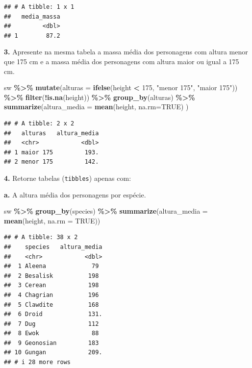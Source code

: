 \documentclass[
]{book}
\newenvironment{Shaded}{\begin{snugshade}}{\end{snugshade}}
\newcommand{\AttributeTok}[1]{\textcolor[rgb]{0.13,0.29,0.53}{#1}}
\newcommand{\ConstantTok}[1]{\textcolor[rgb]{0.56,0.35,0.01}{#1}}
\newcommand{\DecValTok}[1]{\textcolor[rgb]{0.00,0.00,0.81}{#1}}
\newcommand{\FunctionTok}[1]{\textcolor[rgb]{0.13,0.29,0.53}{\textbf{#1}}}
\newcommand{\NormalTok}[1]{#1}
\newcommand{\SpecialCharTok}[1]{\textcolor[rgb]{0.81,0.36,0.00}{\textbf{#1}}}
\newcommand{\StringTok}[1]{\textcolor[rgb]{0.31,0.60,0.02}{#1}}
\begin{document}
\begin{verbatim}
## # A tibble: 1 x 1
##   media_massa
##         <dbl>
## 1        87.2
\end{verbatim}

\textbf{3.} Apresente na mesma tabela a massa média dos personagens com
altura menor que 175 cm e a massa média dos personagens com altura maior
ou igual a 175 cm.

\begin{Shaded}
\begin{Highlighting}[]
\NormalTok{sw }\SpecialCharTok{\%\textgreater{}\%} 
  \FunctionTok{mutate}\NormalTok{(}\AttributeTok{alturas =} \FunctionTok{ifelse}\NormalTok{(height }\SpecialCharTok{\textless{}} \DecValTok{175}\NormalTok{, }\StringTok{"menor 175"}\NormalTok{, }\StringTok{"maior 175"}\NormalTok{)) }\SpecialCharTok{\%\textgreater{}\%}
  \FunctionTok{filter}\NormalTok{(}\SpecialCharTok{!}\FunctionTok{is.na}\NormalTok{(height)) }\SpecialCharTok{\%\textgreater{}\%} 
  \FunctionTok{group\_by}\NormalTok{(alturas) }\SpecialCharTok{\%\textgreater{}\%} 
  \FunctionTok{summarize}\NormalTok{(}\AttributeTok{altura\_media =} \FunctionTok{mean}\NormalTok{(height, }\AttributeTok{na.rm=}\ConstantTok{TRUE}\NormalTok{)}
\NormalTok{  )}
\end{Highlighting}
\end{Shaded}

\begin{verbatim}
## # A tibble: 2 x 2
##   alturas   altura_media
##   <chr>            <dbl>
## 1 maior 175         193.
## 2 menor 175         142.
\end{verbatim}

\textbf{4.} Retorne tabelas (\texttt{tibbles}) apenas com:

\textbf{a.} A altura média dos personagens por espécie.

\begin{Shaded}
\begin{Highlighting}[]
\NormalTok{sw }\SpecialCharTok{\%\textgreater{}\%} 
  \FunctionTok{group\_by}\NormalTok{(species) }\SpecialCharTok{\%\textgreater{}\%} 
  \FunctionTok{summarize}\NormalTok{(}\AttributeTok{altura\_media =} \FunctionTok{mean}\NormalTok{(height, }\AttributeTok{na.rm =} \ConstantTok{TRUE}\NormalTok{))}
\end{Highlighting}
\end{Shaded}

\begin{verbatim}
## # A tibble: 38 x 2
##    species   altura_media
##    <chr>            <dbl>
##  1 Aleena             79 
##  2 Besalisk          198 
##  3 Cerean            198 
##  4 Chagrian          196 
##  5 Clawdite          168 
##  6 Droid             131.
##  7 Dug               112 
##  8 Ewok               88 
##  9 Geonosian         183 
## 10 Gungan            209.
## # i 28 more rows
\end{verbatim}
\end{document}
